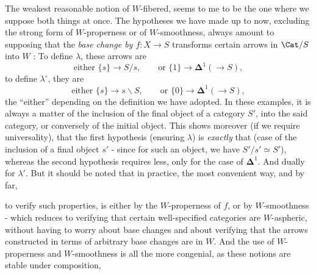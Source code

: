 \leavevmode{}The weakest reasonable notion of $W$-fibered, seems to me to be the one where we suppose both things at once. The hypotheses we have made up to now, excluding the strong form of $W$-properness or of $W$-smoothness, always amount to supposing that the \textit{base change by $f : X\longrightarrow S$} transforms certain arrows in $\Cat/S$ into $W$ : To define $\lambda$, these arrows are
\[
\text{either } \{s\}\longrightarrow S/s,\qquad \text{or } \{1\}\longrightarrow\mathbf{\Delta}^1(\longrightarrow S),
\]
to define $\lambda^\circ$, they are
\[
\text{either } \{s\}\longrightarrow s\backslash S,\qquad \text{or } \{0\}\longrightarrow\mathbf{\Delta}^1(\longrightarrow S),
\]
the ``either'' depending on the definition we have adopted. In these examples, it is always a matter of the inclusion of the final object of a category $S'$, into the said category, or conversely of the initial object. This shows moreover (if we require universality), that the first hypothesis (ensuring $\lambda$) is \textit{exactly} that (case of the inclusion of a final object $s'$ - since for such an object, we have $S'/s'\simeq S'$), whereas the second hypothesis requires less, only for the case of $\mathbf{\Delta}^1$. And dually for $\lambda'$. But it should be noted that in practice, the most convenient way, and by far,

\leavevmode{}to verify such properties, is either by the $W$-properness of $f$, or by $W$-smoothness - which reduces to verifying that certain well-specified categories are $W$-aspheric, without having to worry about base changes and about verifying that the arrows constructed in terms of arbitrary base changes are in $W$. And the use of $W$-properness and $W$-smoothness is all the more congenial, as these notions are stable under composition,